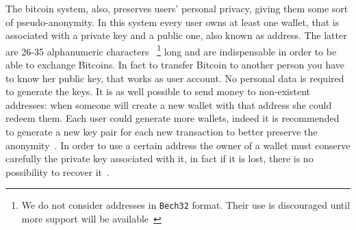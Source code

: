The bitcoin system, also, preserves users' personal privacy, giving them some
sort of pseudo-anonymity. In this system every user owns at least one wallet,
that is associated with a private key and a public one, also known as address.
The latter are 26-35 alphanumeric characters~\cite{bib:bitcoinwiki:address}
\footnote{We do not consider addresses in \texttt{Bech32} format. Their use is
discouraged until more support will be available~\cite{bib:bitcoinwiki:bech32}}
long and are indispensable in order to be able to exchange Bitcoins.
In fact to transfer Bitcoin to another person you have to know her
public key, that works as user account. No personal data is required to generate
the keys. It is as well possible to send money to non-existent addresses: when
someone will create a new wallet with that address she could redeem
them. Each user could generate more wallets, indeed it is recommended
to generate a new key pair for each new transaction to better preserve
the anonymity~\cite{bib:satoshi}. 
In order to use a certain address the owner of
a wallet must conserve carefully the private key associated with it, in fact
if it is lost, there is no possibility to recover it~\cite{bib:respCrypto}.


